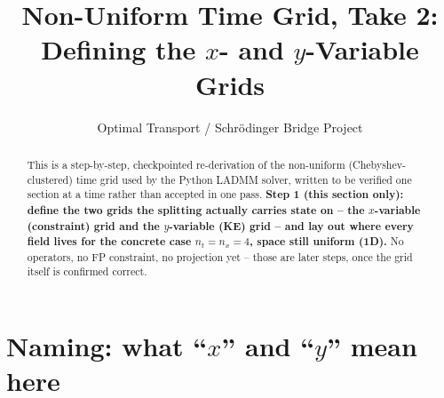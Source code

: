 \documentclass[11pt]{article}
\title{Non-Uniform Time Grid, Take 2:\\ Defining the $x$- and $y$-Variable Grids}
\author{Optimal Transport / Schr\"odinger Bridge Project}
\date{}
\begin{document}
\maketitle

\begin{abstract}
This is a step-by-step, checkpointed re-derivation of the non-uniform (Chebyshev-clustered)
time grid used by the Python LADMM solver, written to be verified one section at a time
rather than accepted in one pass. \textbf{Step 1 (this section only): define the two grids
the splitting actually carries state on -- the $x$-variable (constraint) grid and the
$y$-variable (KE) grid -- and lay out where every field lives for the concrete case
$n_t=n_x=4$, space still uniform (1D).} No operators, no FP constraint, no projection yet --
those are later steps, once the grid itself is confirmed correct.
\end{abstract}

\section{Naming: what ``$x$'' and ``$y$'' mean here}
\label{sec:naming}
\end{document}
